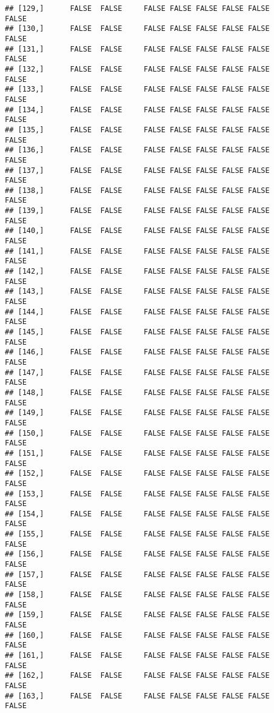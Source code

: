 \documentclass[
]{article}
\begin{document}
\begin{verbatim}
## [129,]      FALSE  FALSE     FALSE FALSE FALSE FALSE FALSE         FALSE
## [130,]      FALSE  FALSE     FALSE FALSE FALSE FALSE FALSE         FALSE
## [131,]      FALSE  FALSE     FALSE FALSE FALSE FALSE FALSE         FALSE
## [132,]      FALSE  FALSE     FALSE FALSE FALSE FALSE FALSE         FALSE
## [133,]      FALSE  FALSE     FALSE FALSE FALSE FALSE FALSE         FALSE
## [134,]      FALSE  FALSE     FALSE FALSE FALSE FALSE FALSE         FALSE
## [135,]      FALSE  FALSE     FALSE FALSE FALSE FALSE FALSE         FALSE
## [136,]      FALSE  FALSE     FALSE FALSE FALSE FALSE FALSE         FALSE
## [137,]      FALSE  FALSE     FALSE FALSE FALSE FALSE FALSE         FALSE
## [138,]      FALSE  FALSE     FALSE FALSE FALSE FALSE FALSE         FALSE
## [139,]      FALSE  FALSE     FALSE FALSE FALSE FALSE FALSE         FALSE
## [140,]      FALSE  FALSE     FALSE FALSE FALSE FALSE FALSE         FALSE
## [141,]      FALSE  FALSE     FALSE FALSE FALSE FALSE FALSE         FALSE
## [142,]      FALSE  FALSE     FALSE FALSE FALSE FALSE FALSE         FALSE
## [143,]      FALSE  FALSE     FALSE FALSE FALSE FALSE FALSE         FALSE
## [144,]      FALSE  FALSE     FALSE FALSE FALSE FALSE FALSE         FALSE
## [145,]      FALSE  FALSE     FALSE FALSE FALSE FALSE FALSE         FALSE
## [146,]      FALSE  FALSE     FALSE FALSE FALSE FALSE FALSE         FALSE
## [147,]      FALSE  FALSE     FALSE FALSE FALSE FALSE FALSE         FALSE
## [148,]      FALSE  FALSE     FALSE FALSE FALSE FALSE FALSE         FALSE
## [149,]      FALSE  FALSE     FALSE FALSE FALSE FALSE FALSE         FALSE
## [150,]      FALSE  FALSE     FALSE FALSE FALSE FALSE FALSE         FALSE
## [151,]      FALSE  FALSE     FALSE FALSE FALSE FALSE FALSE         FALSE
## [152,]      FALSE  FALSE     FALSE FALSE FALSE FALSE FALSE         FALSE
## [153,]      FALSE  FALSE     FALSE FALSE FALSE FALSE FALSE         FALSE
## [154,]      FALSE  FALSE     FALSE FALSE FALSE FALSE FALSE         FALSE
## [155,]      FALSE  FALSE     FALSE FALSE FALSE FALSE FALSE         FALSE
## [156,]      FALSE  FALSE     FALSE FALSE FALSE FALSE FALSE         FALSE
## [157,]      FALSE  FALSE     FALSE FALSE FALSE FALSE FALSE         FALSE
## [158,]      FALSE  FALSE     FALSE FALSE FALSE FALSE FALSE         FALSE
## [159,]      FALSE  FALSE     FALSE FALSE FALSE FALSE FALSE         FALSE
## [160,]      FALSE  FALSE     FALSE FALSE FALSE FALSE FALSE         FALSE
## [161,]      FALSE  FALSE     FALSE FALSE FALSE FALSE FALSE         FALSE
## [162,]      FALSE  FALSE     FALSE FALSE FALSE FALSE FALSE         FALSE
## [163,]      FALSE  FALSE     FALSE FALSE FALSE FALSE FALSE         FALSE

\end{verbatim}
\end{document}
